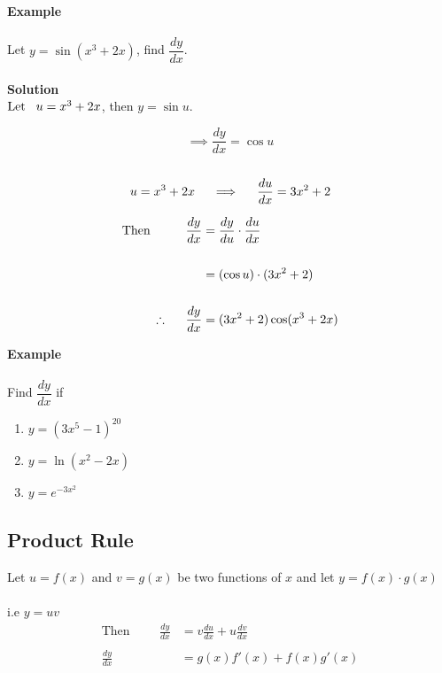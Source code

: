 \documentclass[11pt,a4paper]{article}
\begin{document}
\textbf{Example}\\\\
Let $y=\sin (x^3+2x)$, find $\dfrac{dy}{dx}$.\\\\





\pagebreak
\textbf{Solution}\\
$\text{Let}\hspace{0.3cm} u=x^3+2x$, then $y = \sin u$.


$$\implies \frac{dy}{dx}=\cos u$$\\
$$u=x^3+2x\hspace{0.4cm} \implies \hspace{0.4cm} \frac{du}{dx}=3x^2+2$$

\begin{align*}
\text{Then}\hspace{1cm} \frac{dy}{dx} & =\frac{dy}{du}\cdot \frac{du}{dx}\\\\
&  = (\cos u)\cdot (3x^2+2)\\\\
\therefore \hspace{0.5cm} \frac{dy}{dx} & = (3x^2+2)\cos (x^3+2x)\\
\end{align*}


\textbf{Example}\\\\
Find $\dfrac{dy}{dx}$ if
\begin{enumerate}
\item $y=(3x^5-1)^{20}$\\
\item $y=\ln (x^2-2x)$\\
\item $y=e^{-3x^2}$\\
\end{enumerate}


\subsection{Product Rule}
Let $u=f(x)$ and $v=g(x)$ be two functions of $x$ and let $y=f(x)\cdot g(x)$\\\\
i.e $y=uv$\\

\begin{align*}
\text{Then}\hspace{1cm} \frac{dy}{dx} &=v \frac{du}{dx}+u \frac{dv}{dx}\\\\
\frac{dy}{dx} &= g(x) f'(x) + f(x) g'(x)\\
\end{align*}
\end{document}
